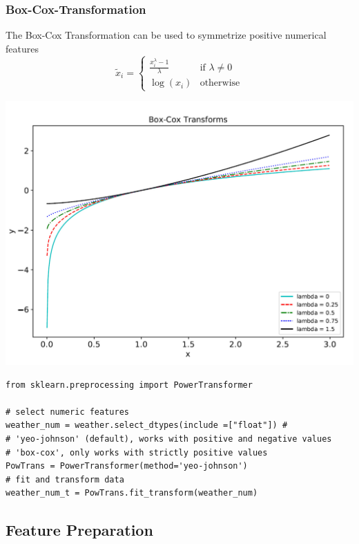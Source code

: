 \documentclass[11pt]{article}
\theoremstyle{definition}
\begin{document}
\subsubsection{Box-Cox-Transformation}
\begin{minipage}{0.5\linewidth}
	The Box-Cox Transformation can be used to symmetrize positive numerical features
	\begin{equation*}
		\tilde{x}_i = \left\{ \begin{matrix}
		\frac{x_i^\lambda - 1}{\lambda} & \text{if }\lambda\neq 0\\
		\log(x_i) & \text{otherwise}
		\end{matrix} \right.
	\end{equation*}
\end{minipage}
\begin{minipage}{0.5\linewidth}
	\begin{center}
		\includegraphics[width=0.9\linewidth]{img/boxcox_lambdas}
	\end{center}
\end{minipage}
\begin{verbatim}
from sklearn.preprocessing import PowerTransformer

# select numeric features
weather_num = weather.select_dtypes(include =["float"]) #
# 'yeo-johnson' (default), works with positive and negative values
# 'box-cox', only works with strictly positive values
PowTrans = PowerTransformer(method='yeo-johnson')
# fit and transform data
weather_num_t = PowTrans.fit_transform(weather_num)
\end{verbatim}

\subsection{Feature Preparation}
\end{document}
